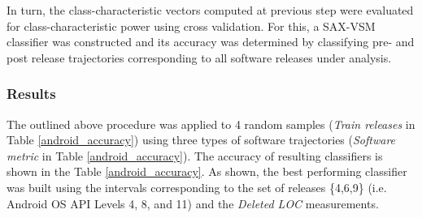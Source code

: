 \begin{table}[t]
\centering
{}
\end{table}

In turn, the class-characteristic vectors computed at previous step were evaluated for class-characteristic power using cross validation. For this, a SAX-VSM classifier was constructed and its accuracy was determined by classifying pre- and post release trajectories corresponding to all software releases under analysis.

\subsubsection{Results}
The outlined above procedure was applied to 4 random samples (\textit{Train releases} in Table  \ref{android_accuracy}) using three types of software trajectories (\textit{Software metric} in Table  \ref{android_accuracy}). The accuracy of resulting classifiers is shown in the Table  \ref{android_accuracy}. As shown, the best performing classifier was built using the intervals corresponding to the set of releases \{4,6,9\} (i.e. Android OS API Levels 4, 8, and 11) and the \textit{Deleted LOC} measurements.

